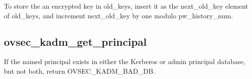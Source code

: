 To store the an encrypted key in old_keys, insert it as the
next_old_key element of old_keys, and increment next_old_key by one
modulo pw_history_num.

\subsection{ovsec_kadm_get_principal}

If the named principal exists in either the Kerberos or admin
principal database, but not both, return OVSEC_KADM_BAD_DB.


